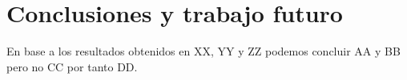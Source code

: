 \chapter{Conclusiones y trabajo futuro}
En base a los resultados obtenidos en XX, YY y ZZ podemos concluir AA y BB pero no CC por tanto DD.
